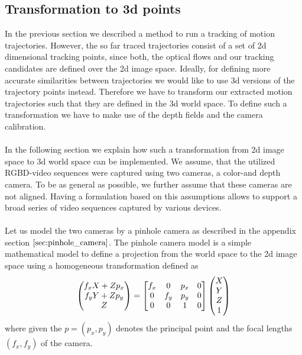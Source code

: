 \subsection{Transformation to 3d points}
\label{subsection:transform_to_3d_points}
In the previous section we described a method to run a tracking of motion trajectories. However, the so far traced trajectories consist of a set of 2d dimensional tracking points, since both, the optical flows and our tracking candidates are defined over the 2d image space. Ideally, for defining more accurate similarities between trajectories we would like to use 3d versions of the trajectory points instead. Therefore we have to transform our extracted motion trajectories such that they are defined in the 3d world space. To define such a transformation we have to make use of the depth fields and the camera calibration. \\ \\
In the following section we explain how such a transformation from 2d image space to 3d world space can be implemented. We assume, that the utilized RGBD-video sequences were captured using two cameras, a color-and depth camera. To be as general as possible, we further assume that these cameras are not aligned. Having a formulation based on this assumptions allows to support a broad series of video sequences captured by various devices. \\ \\
Let us model the two cameras by a pinhole camera as described in the appendix section $\ref{sec:pinhole_camera}$. The pinhole camera model is a simple mathematical model to define a projection from the world space to the 2d image space using a homogeneous transformation defined as 
\begin{equation}
\colvec[f_x X + Z p_x]{f_y Y + Z p_y}{Z} =
\begin{bmatrix}
f_x & 0 & p_x & 0 \\
0 & f_y & p_y & 0 \\
0 & 0 & 1 & 0
\end{bmatrix}
\begin{pmatrix}
X \\
Y \\
Z \\
1
\end{pmatrix}
\label{eq:homogen_camera_mat_transf}
\end{equation}
where given the  $p = \left(p_x, p_y \right)$ denotes the principal point and the focal lengths $\left(f_x, f_y \right)$ of the camera. \\ \\
